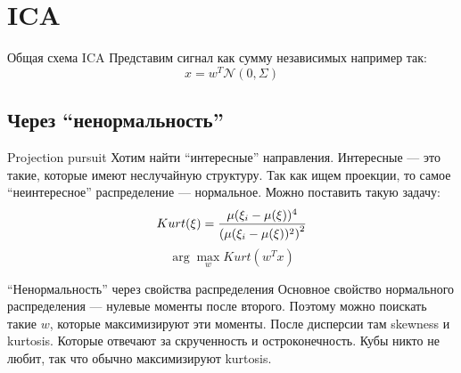 \documentclass[14pt, fleqn, xcolor={dvipsnames, table}]{beamer}
\begin{document}
\section{ICA}
\begin{frame}{Общая схема ICA}
Представим сигнал как сумму независимых например так:
$$x = w^T\mathcal{N}(0, \Sigma)$$
\end{frame}

\subsection{Через ``ненормальность''}
\begin{frame}{Projection pursuit}
Хотим найти ``интересные'' направления. Интересные --- это такие, которые имеют неслучайную структуру. Так как ищем проекции, то самое ``неинтересное'' распределение --- нормальное. Можно поставить такую задачу:
$$
Kurt(\xi)={\mu(\xi_i - \mu(\xi))^4\over \left(\mu(\xi_i - \mu(\xi))^2\right)^2}
$$
$$
\arg \max_w Kurt(w^T x)
$$

\end{frame}

\begin{frame}{``Ненормальность'' через свойства распределения}
Основное свойство нормального распределения --- нулевые моменты после второго. Поэтому можно поискать такие $w$, которые максимизируют эти моменты. После дисперсии там skewness и kurtosis. Которые отвечают за скрученность и остроконечность. Кубы никто не любит, так что обычно максимизируют kurtosis.
\end{frame}
\end{document}
